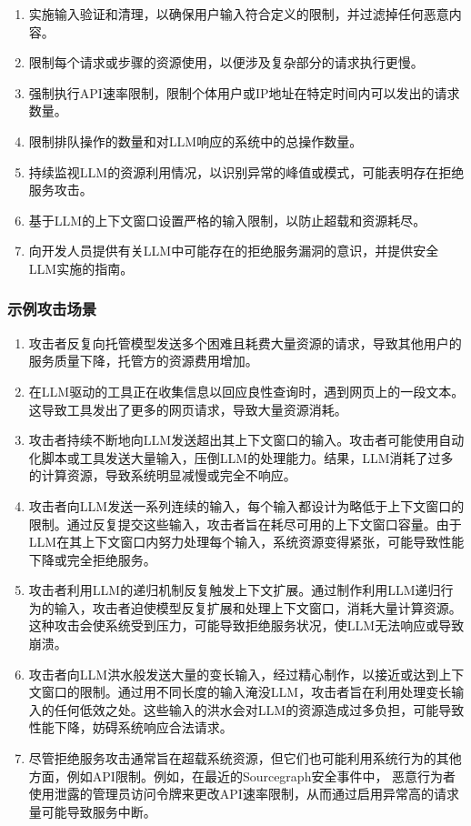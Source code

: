 \documentclass[
]{article}
\providecommand{\tightlist}{%
  \setlength{\itemsep}{0pt}\setlength{\parskip}{0pt}}
\begin{document}
\begin{enumerate}
\def\labelenumi{\arabic{enumi}.}
\tightlist
\item
  实施输入验证和清理，以确保用户输入符合定义的限制，并过滤掉任何恶意内容。
\item
  限制每个请求或步骤的资源使用，以便涉及复杂部分的请求执行更慢。
\item
  强制执行API速率限制，限制个体用户或IP地址在特定时间内可以发出的请求数量。
\item
  限制排队操作的数量和对LLM响应的系统中的总操作数量。
\item
  持续监视LLM的资源利用情况，以识别异常的峰值或模式，可能表明存在拒绝服务攻击。
\item
  基于LLM的上下文窗口设置严格的输入限制，以防止超载和资源耗尽。
\item
  向开发人员提供有关LLM中可能存在的拒绝服务漏洞的意识，并提供安全LLM实施的指南。
\end{enumerate}

\subsubsection{示例攻击场景}\label{ux793aux4f8bux653bux51fbux573aux666f}

\begin{enumerate}
\def\labelenumi{\arabic{enumi}.}
\tightlist
\item
  攻击者反复向托管模型发送多个困难且耗费大量资源的请求，导致其他用户的服务质量下降，托管方的资源费用增加。
\item
  在LLM驱动的工具正在收集信息以回应良性查询时，遇到网页上的一段文本。这导致工具发出了更多的网页请求，导致大量资源消耗。
\item
  攻击者持续不断地向LLM发送超出其上下文窗口的输入。攻击者可能使用自动化脚本或工具发送大量输入，压倒LLM的处理能力。结果，LLM消耗了过多的计算资源，导致系统明显减慢或完全不响应。
\item
  攻击者向LLM发送一系列连续的输入，每个输入都设计为略低于上下文窗口的限制。通过反复提交这些输入，攻击者旨在耗尽可用的上下文窗口容量。由于LLM在其上下文窗口内努力处理每个输入，系统资源变得紧张，可能导致性能下降或完全拒绝服务。
\item
  攻击者利用LLM的递归机制反复触发上下文扩展。通过制作利用LLM递归行为的输入，攻击者迫使模型反复扩展和处理上下文窗口，消耗大量计算资源。这种攻击会使系统受到压力，可能导致拒绝服务状况，使LLM无法响应或导致崩溃。
\item
  攻击者向LLM洪水般发送大量的变长输入，经过精心制作，以接近或达到上下文窗口的限制。通过用不同长度的输入淹没LLM，攻击者旨在利用处理变长输入的任何低效之处。这些输入的洪水会对LLM的资源造成过多负担，可能导致性能下降，妨碍系统响应合法请求。
\item
  尽管拒绝服务攻击通常旨在超载系统资源，但它们也可能利用系统行为的其他方面，例如API限制。例如，在最近的Sourcegraph安全事件中，
  恶意行为者使用泄露的管理员访问令牌来更改API速率限制，从而通过启用异常高的请求量可能导致服务中断。
\end{enumerate}
\end{document}

